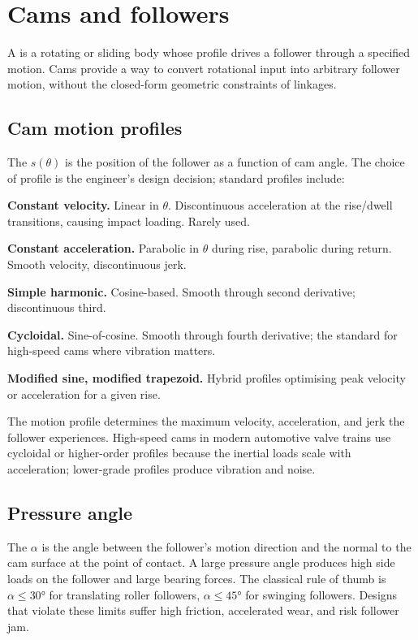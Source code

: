 \section{Cams and followers}

A  is a rotating or sliding body whose profile drives a follower through a specified motion. Cams provide a way to convert rotational input into arbitrary follower motion, without the closed-form geometric constraints of linkages.

\subsection{Cam motion profiles}

The  $s(\theta)$ is the position of the follower as a function of cam angle. The choice of profile is the engineer's design decision; standard profiles include:

\textbf{Constant velocity.} Linear in $\theta$. Discontinuous acceleration at the rise/dwell transitions, causing impact loading. Rarely used.

\textbf{Constant acceleration.} Parabolic in $\theta$ during rise, parabolic during return. Smooth velocity, discontinuous jerk.

\textbf{Simple harmonic.} Cosine-based. Smooth through second derivative; discontinuous third.

\textbf{Cycloidal.} Sine-of-cosine. Smooth through fourth derivative; the standard for high-speed cams where vibration matters.

\textbf{Modified sine, modified trapezoid.} Hybrid profiles optimising peak velocity or acceleration for a given rise.

The motion profile determines the maximum velocity, acceleration, and jerk the follower experiences. High-speed cams in modern automotive valve trains use cycloidal or higher-order profiles because the inertial loads scale with acceleration; lower-grade profiles produce vibration and noise.

\subsection{Pressure angle}

The  $\alpha$ is the angle between the follower's motion direction and the normal to the cam surface at the point of contact. A large pressure angle produces high side loads on the follower and large bearing forces. The classical rule of thumb is $\alpha \leq 30°$ for translating roller followers, $\alpha \leq 45°$ for swinging followers. Designs that violate these limits suffer high friction, accelerated wear, and risk follower jam.

